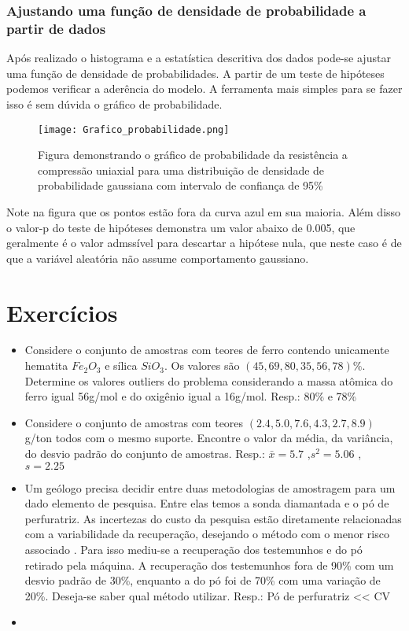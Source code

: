 \subsubsection{Ajustando uma função de densidade de probabilidade a partir de dados}

Após realizado o histograma e a estatística descritiva dos dados pode-se ajustar uma função de densidade de probabilidades. A partir de um teste de hipóteses podemos verificar a aderência do modelo. A ferramenta mais simples para se fazer isso é sem dúvida o gráfico de probabilidade. 

\begin{figure}[H]
  	\centering
  	\texttt{[image: Grafico\_probabilidade.png]}	
  	\caption{Figura demonstrando o gráfico de probabilidade da resistência a compressão uniaxial para uma distribuição de densidade de probabilidade gaussiana com intervalo de confiança de 95\% }
  	\label{Grafico_probabilidade}
\end{figure}

Note na figura que os pontos estão fora da curva azul em sua maioria. Além disso o valor-p do teste de hipóteses demonstra um valor abaixo de 0.005, que geralmente é o valor admssível para descartar a hipótese nula, que neste caso é de que a variável aleatória não assume comportamento gaussiano.  

\section{Exercícios}

\begin{itemize}
	\item Considere o conjunto de amostras com teores de ferro contendo unicamente hematita $Fe_{2}O_{3}$ e sílica $SiO_{3}$. Os valores são $\left(45,69,80,35,56,78\right)\%$. Determine os valores outliers do problema considerando a massa atômica do ferro igual 56g/mol e do oxigênio igual a 16g/mol. Resp.: 80\% e 78\%
	\item Considere o conjunto de amostras com teores $\left(2.4,5.0,7.6,4.3,2.7,8.9\right)$ g/ton todos com o mesmo suporte. Encontre o valor da média, da variância, do desvio padrão do conjunto de amostras. Resp.: $\bar{x}= 5.7$ ,$s^2 = 5.06$ , $s = 2.25$
	\item Um geólogo precisa decidir entre duas metodologias de amostragem para um dado elemento de pesquisa. Entre elas temos a sonda diamantada e o pó de perfuratriz. As incertezas do custo da pesquisa estão diretamente relacionadas com a variabilidade da recuperação, desejando o método com o menor risco associado . Para isso mediu-se a recuperação dos testemunhos e do pó retirado pela máquina. A recuperação dos testemunhos fora de 90\% com um desvio padrão de 30\%, enquanto a do pó foi de 70\% com uma variação de 20\%. Deseja-se saber qual método utilizar. Resp.: Pó de perfuratriz << CV
	\item 
	
	 
\end{itemize} 
